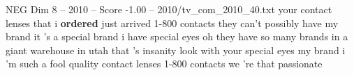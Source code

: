 \begin{textsample}{NEG Dim 8 – 2010 – Score -1.00 – 2010/tv\_com\_2010\_40.txt}  \label{ex:f8_neg_043}
your contact lenses that i \textbf{ordered} just arrived 1-800 contacts they can't possibly have my brand it 's a special brand i have special eyes oh they have so many brands in a giant warehouse in utah that 's insanity look with your special eyes my brand i 'm such a fool quality contact lenses 1-800 contacts we 're that passionate

\end{textsample}
